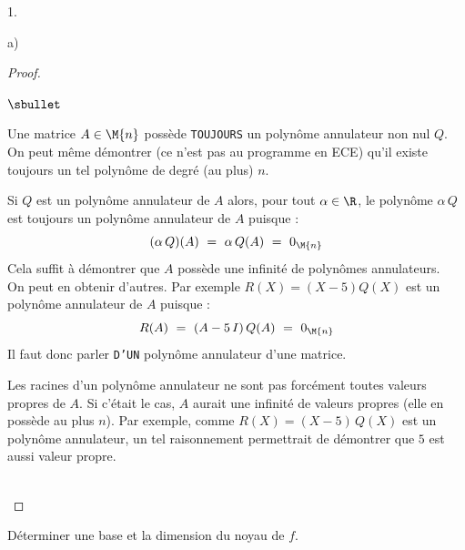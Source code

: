 \documentclass[11pt]{article}%
\begin{document}
\begin{noliste}{1.}
\begin{noliste}{a)}
\begin{proof}
      \newpage

	
      \begin{remarkL}{.98}
        \begin{noliste}{$\sbullet$}
        \item Une matrice $A\in \M{n}$ possède {\tt TOUJOURS} un
          polynôme annulateur non nul $Q$.\\
          On peut même démontrer (ce n'est pas au programme en ECE)
          qu'il existe toujours un tel polynôme de degré (au plus)
          $n$.
	    
        \item Si $Q$ est un polynôme annulateur de $A$ alors, pour
          tout $\alpha \in \R$, le polynôme $\alpha \, Q$ est toujours
          un polynôme annulateur de $A$ puisque :
          \[
          (\alpha \, Q)(A) \ = \ \alpha \, Q(A) \ = \ 0_{\M{n}}
          \]
          Cela suffit à démontrer que $A$ possède une infinité de
          polynômes annulateurs.\\
          On peut en obtenir d'autres. Par exemple $R(X) =
          (X-5)Q(X)$ est un polynôme annulateur de $A$ puisque :
          \[
          R(A) \ = \ (A-5 \, I) \, Q(A) \ = \ 0_{\M{n}}
          \]
          Il faut donc parler {\tt D'UN} polynôme annulateur d'une
          matrice.
          
        \item Les racines d'un polynôme annulateur ne sont pas
          forcément toutes valeurs propres de $A$. Si c'était le
          cas, $A$ aurait une infinité de valeurs propres (elle en
          possède au plus $n$). Par exemple, comme $R(X) = (X-5) \,
          Q(X)$ est un polynôme annulateur, un tel raisonnement
          permettrait de démontrer que $5$ est aussi valeur propre.
        \end{noliste}
      \end{remarkL}~\\[-1.5cm]
    \end{proof}

  \item Déterminer une base et la dimension du noyau de $f$. 


\end{noliste}
\end{noliste}
\end{document}
